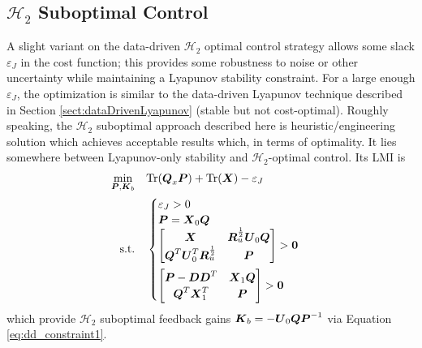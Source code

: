 \subsection{$\mathcal{H}_{2}$ Suboptimal Control}
\label{sect:dataDrivenH2Suboptimal}
A slight variant on the data-driven $\mathcal{H}_{2}$ optimal control strategy allows some slack $\varepsilon_{J}$ in the cost function; this provides some robustness to noise or other uncertainty while maintaining a Lyapunov stability constraint.  For a large enough $\varepsilon_{J}$, the optimization is similar to the data-driven Lyapunov technique described in Section \ref{sect:dataDrivenLyapunov} (stable but not cost-optimal).  Roughly speaking, the $\mathcal{H}_{2}$ suboptimal approach described here is heuristic/engineering solution which achieves acceptable results which, in terms of optimality.  It lies somewhere between Lyapunov-only stability and $\mathcal{H}_{2}$-optimal control.  Its LMI is
\begin{equation}
\label{eq:h2s_lmi_dd}
\begin{aligned}
	\underset{\vb*{P}, \vb*{K}_{b}}{\min} \quad & \text{Tr}(\vb*{Q}_{x}\vb*{P}) + \text{Tr}(\vb*{X}) - \varepsilon_{J}\\
	\textrm{s.t.} \quad & \begin{cases}
		\varepsilon_{J} > 0\\ \vspace{-15pt}\\
		\vb*{P} = \vb*{X}_{0}\vb*{Q}\\ \vspace{-15pt}\\
		\begin{bmatrix}
			\vb*{X} & \vb*{R}_{u}^{\frac{1}{2}}\vb*{U}_{0}\vb*{Q}\\
			\vb*{Q}^{T}\vb*{U}_{0}^{T}\vb*{R}_{u}^{\frac{1}{2}} & \vb*{P}\\
		\end{bmatrix} > \vb*{0}\\ \vspace{-10pt}\\
		\begin{bmatrix}
			\vb*{P} - \vb*{D}\vb*{D}^{T} & \vb*{X}_{1}\vb*{Q}\\
			\vb*{Q}^{T}\vb*{X}_{1}^{T} & \vb*{P}\\
		\end{bmatrix} > \vb*{0}
	\end{cases}
\end{aligned}
\end{equation}
which provide $\mathcal{H}_{2}$ suboptimal feedback gains $\vb*{K}_{b} = -\vb*{U}_{0}\vb*{Q}\vb*{P}^{-1}$ via Equation \eqref{eq:dd_constraint1}.
